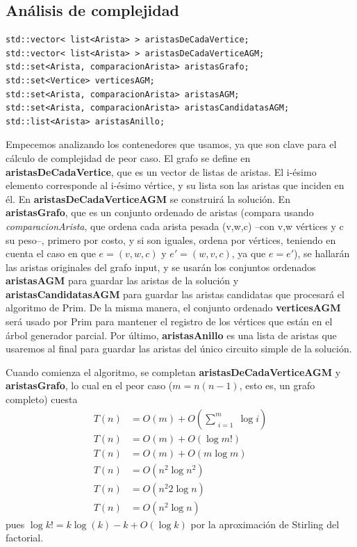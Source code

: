 \newpage

\subsection{Análisis de complejidad}

\begin{minipage}{\linewidth}
\begin{lstlisting}[basicstyle=\normalsize\ttfamily, frame=single]
std::vector< list<Arista> > aristasDeCadaVertice;
std::vector< list<Arista> > aristasDeCadaVerticeAGM;
std::set<Arista, comparacionArista> aristasGrafo;
std::set<Vertice> verticesAGM;
std::set<Arista, comparacionArista> aristasAGM;
std::set<Arista, comparacionArista> aristasCandidatasAGM;
std::list<Arista> aristasAnillo;
\end{lstlisting}
\end{minipage}

Empecemos analizando los contenedores que usamos, ya que son clave para el cálculo de complejidad de peor caso. El grafo se define en \textbf{aristasDeCadaVertice}, que es un vector de listas de aristas. El i-ésimo elemento corresponde al i-ésimo vértice, y su lista son las aristas que inciden en él. En \textbf{aristasDeCadaVerticeAGM} se construirá la solución. En \textbf{aristasGrafo}, que es un conjunto ordenado de aristas (compara usando \emph{comparacionArista}, que ordena cada arista pesada (v,w,c) --con v,w vértices y c su peso--, primero por costo, y si son iguales, ordena por vértices, teniendo en cuenta el caso en que $e = (v,w,c)$ y $e' = (w,v,c)$, ya que $e = e'$), se hallarán las aristas originales del grafo input, y se usarán los conjuntos ordenados \textbf{aristasAGM} para guardar las aristas de la solución y \textbf{aristasCandidatasAGM} para guardar las aristas candidatas que procesará el algoritmo de Prim. De la misma manera, el conjunto ordenado \textbf{verticesAGM} será usado por Prim para mantener el registro de los vértices que están en el árbol generador parcial. Por último, \textbf{aristasAnillo} es una lista de aristas que usaremos al final para guardar las aristas del único circuito simple de la solución.

Cuando comienza el algoritmo, se completan \textbf{aristasDeCadaVerticeAGM} y \textbf{aristasGrafo}, lo cual en el peor caso ($m = n (n - 1)$, esto es, un grafo completo) cuesta
\begin{align*}
T(n) &= O(m) + O\left(\sum\limits_{\substack{i = 1}}^m \log i\right) \\
T(n) &= O(m) + O(\log m!) \\
T(n) &= O(m) + O(m \log m) \\
T(n) &= O(n^2 \log n^2) \\
T(n) &= O(n^2 2\log n) \\
T(n) &= O(n^2 \log n)
\end{align*}
pues $\log k! = k \log(k) - k + O(\log k)$ por la aproximación de Stirling del factorial.

